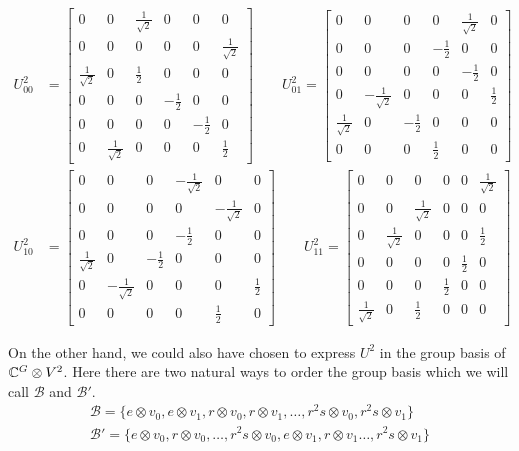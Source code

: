 \documentclass[10pt,reqno]{amsart}
\numberwithin{equation}{section}
\begin{document}
	\begin{align}
		U^2_{00} &= \begin{bmatrix}
		0 & 0 & \frac{1}{\sqrt{2}} & 0 & 0 & 0 \\
		0 & 0 & 0 &0 &0 &\frac{1}{\sqrt{2}}\\
		\frac{1}{\sqrt{2}} & 0 & \frac{1}{2} & 0 & 0 &0 \\
		0 & 0 & 0 & -\frac{1}{2} &0 & 0 \\
		0 &0 &0 &0 &-\frac{1}{2} & 0\\
		0 &\frac{1}{\sqrt{2}} &0 &0 &0 & \frac{1}{2}
		\end{bmatrix}
		\qquad U^2_{01}=\begin{bmatrix}
		0 & 0 & 0 &  0&\frac{1}{\sqrt{2}}  & 0 \\
		0 &0 &0 &-\frac{1}{2}&0  & 0\\
		0 & 0 & 0  &0& -\frac{1}{2} & 0 \\
		0 & -\frac{1}{\sqrt{2}} & 0 & 0 & 0 &\frac{1}{2} \\
		\frac{1}{\sqrt{2}} &0 & -\frac{1}{2}&0 &0 &0 \\
		0 &0 &0 &\frac{1}{2}&0  & 0
		\end{bmatrix}\nonumber\\
		U^2_{10}&= \begin{bmatrix}
		0 &0 &0 &-\frac{1}{\sqrt{2}} &0 & 0\\
		0 & 0 & 0 &  0 &-\frac{1}{\sqrt{2}} & 0 \\
		0 &0 &0 &-\frac{1}{2}&0  & 0\\
		\frac{1}{\sqrt{2}} & 0& -\frac{1}{2} &0 &0 &0 \\
		0 & -\frac{1}{\sqrt{2}} & 0& 0 & 0 &\frac{1}{2} \\
		0 & 0 & 0  &0 & \frac{1}{2}& 0 
		\end{bmatrix}
		\qquad U^2_{11}=\begin{bmatrix}
		0 & 0 & 0 &0 &0 &\frac{1}{\sqrt{2}}\\
		0 & 0 & \frac{1}{\sqrt{2}} & 0 & 0 & 0\\
		0 &\frac{1}{\sqrt{2}} &0 &0 &0 & \frac{1}{2}\\
		0 & 0 & 0 & 0 &\frac{1}{2} & 0\\
		0 & 0 & 0 & \frac{1}{2} &0 & 0 \\
		\frac{1}{\sqrt{2}} & 0 & \frac{1}{2} & 0 & 0 &0 
		\end{bmatrix}
	\end{align}
	
	On the other hand, we could also have chosen to express $U^2$ in the group basis of $\mathbb{C}^G \otimes V^2$.
	Here there are two natural ways to order the group basis which we will call $\mathcal{B}$ and $\mathcal{B}'$.
	\begin{align*}
		\mathcal{B}=\{e\otimes v_0,e\otimes v_1,r\otimes v_0, r\otimes v_1,\ldots, r^2s \otimes v_0, r^2s\otimes v_1  \}\\
		\mathcal{B'}=\{e\otimes v_0,r\otimes v_0,\ldots,r^2s\otimes v_0, e\otimes v_1, r\otimes v_1\ldots, r^2s\otimes v_1\}
	\end{align*}
	
\end{document}
